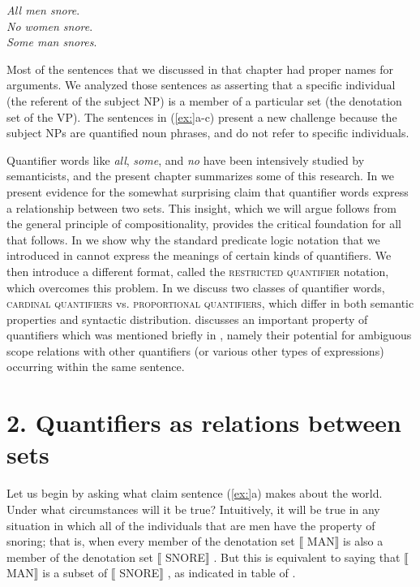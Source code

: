 \ea
\ea \textit{All men snore}.\\
\ex \textit{No women snore}.\\
\ex \textit{Some man snores}.
                       \z
\z


Most of the sentences that we discussed in that chapter had proper names for arguments. We analyzed those sentences as asserting that a specific individual (the referent of the subject NP) is a member of a particular set (the denotation set of the VP). The sentences in (\ref{ex:}a-c) present a new challenge because the subject NPs are quantified noun phrases, and do not refer to specific individuals.



Quantifier words like \textit{all}, \textit{some}, and \textit{no} have been intensively studied by semanticists, and the present chapter summarizes some of this research. In  we present evidence for the somewhat surprising claim that quantifier words express a relationship between two sets. This insight, which we will argue follows from the general principle of compositionality, provides the critical foundation for all that follows. In  we show why the standard predicate logic notation that we introduced in  cannot express the meanings of certain kinds of quantifiers. We then introduce a different format, called the \textsc{restricted quantifier} notation, which overcomes this problem. In  we discuss two classes of quantifier words, \textsc{cardinal quantifiers} vs. \textsc{proportional quantifiers}, which differ in both semantic properties and syntactic distribution.  discusses an important property of quantifiers which was mentioned briefly in , namely their potential for ambiguous scope relations with other quantifiers (or various other types of expressions) occurring within the same sentence.


\section{2. Quantifiers as relations between sets}\label{sec:}

Let us begin by asking what claim sentence (\ref{ex:}a) makes about the world. Under what circumstances will it be true? Intuitively, it will be true in any situation in which all of the individuals that are men have the property of snoring; that is, when every member of the denotation set $\llbracket$ MAN$\rrbracket$  is also a member of the denotation set $\llbracket$ SNORE$\rrbracket$ . But this is equivalent to saying that $\llbracket$ MAN$\rrbracket$  is a subset of $\llbracket$ SNORE$\rrbracket$ , as indicated in table  of .



